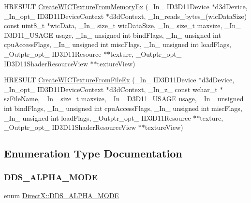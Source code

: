 \begin{DoxyCompactItemize}
\item 
H\+R\+E\+S\+U\+LT \mbox{\hyperlink{namespace_direct_x_ae20d2e1ac1ab3927c6bf8873b67e8b4b}{Create\+W\+I\+C\+Texture\+From\+Memory\+Ex}} (\+\_\+\+In\+\_\+ I\+D3\+D11\+Device $\ast$d3d\+Device, \+\_\+\+In\+\_\+opt\+\_\+ I\+D3\+D11\+Device\+Context $\ast$d3d\+Context, \+\_\+\+In\+\_\+reads\+\_\+bytes\+\_\+(wic\+Data\+Size) const uint8\+\_\+t $\ast$wic\+Data, \+\_\+\+In\+\_\+ size\+\_\+t wic\+Data\+Size, \+\_\+\+In\+\_\+ size\+\_\+t maxsize, \+\_\+\+In\+\_\+ D3\+D11\+\_\+\+U\+S\+A\+GE usage, \+\_\+\+In\+\_\+ unsigned int bind\+Flags, \+\_\+\+In\+\_\+ unsigned int cpu\+Access\+Flags, \+\_\+\+In\+\_\+ unsigned int misc\+Flags, \+\_\+\+In\+\_\+ unsigned int load\+Flags, \+\_\+\+Outptr\+\_\+opt\+\_\+ I\+D3\+D11\+Resource $\ast$$\ast$texture, \+\_\+\+Outptr\+\_\+opt\+\_\+ I\+D3\+D11\+Shader\+Resource\+View $\ast$$\ast$texture\+View)
\item 
H\+R\+E\+S\+U\+LT \mbox{\hyperlink{namespace_direct_x_add6a4b3cabfab65339e9816320bf2f5a}{Create\+W\+I\+C\+Texture\+From\+File\+Ex}} (\+\_\+\+In\+\_\+ I\+D3\+D11\+Device $\ast$d3d\+Device, \+\_\+\+In\+\_\+opt\+\_\+ I\+D3\+D11\+Device\+Context $\ast$d3d\+Context, \+\_\+\+In\+\_\+z\+\_\+ const wchar\+\_\+t $\ast$sz\+File\+Name, \+\_\+\+In\+\_\+ size\+\_\+t maxsize, \+\_\+\+In\+\_\+ D3\+D11\+\_\+\+U\+S\+A\+GE usage, \+\_\+\+In\+\_\+ unsigned int bind\+Flags, \+\_\+\+In\+\_\+ unsigned int cpu\+Access\+Flags, \+\_\+\+In\+\_\+ unsigned int misc\+Flags, \+\_\+\+In\+\_\+ unsigned int load\+Flags, \+\_\+\+Outptr\+\_\+opt\+\_\+ I\+D3\+D11\+Resource $\ast$$\ast$texture, \+\_\+\+Outptr\+\_\+opt\+\_\+ I\+D3\+D11\+Shader\+Resource\+View $\ast$$\ast$texture\+View)
\end{DoxyCompactItemize}


\subsection{Enumeration Type Documentation}
\mbox{\label{namespace_direct_x_a7cb48689d75471680c0bf7f79caaaf1f}} 
\subsubsection{\texorpdfstring{D\+D\+S\+\_\+\+A\+L\+P\+H\+A\+\_\+\+M\+O\+DE}{DDS\_ALPHA\_MODE}}
{\footnotesize\ttfamily enum \mbox{\hyperlink{namespace_direct_x_a7cb48689d75471680c0bf7f79caaaf1f}{Direct\+X\+::\+D\+D\+S\+\_\+\+A\+L\+P\+H\+A\+\_\+\+M\+O\+DE}}}

